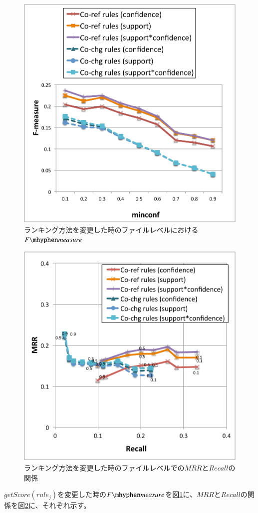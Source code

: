 \documentclass[a4paper]{jsbook}
\newcommand{\fmeasure}{F\mhyphen measure}
\newcommand{\getScore}{getS\!core}
\begin{document}
\begin{figure}[p]
  \centering
  \includegraphics[width = 0.95\linewidth]{resource/fmeasure_rank_f.pdf}
  \caption{ランキング方法を変更した時のファイルレベルにおける$\fmeasure$}
  \label{f_fmeasure_rank}
\end{figure}
\begin{figure}[p]
  \centering
  \includegraphics[width = 0.95\linewidth]{resource/mrgraph_rank_f.pdf}
  \caption{ランキング方法を変更した時のファイルレベルでの$MRR$と$Recall$の関係}
  \label{f_mrgraph_rank}
\end{figure}
$\getScore(rule_j)$を変更した時の$\fmeasure$を図\ref{f_fmeasure_rank}に、$MRR$と$Recall$の関係を図\ref{f_mrgraph_rank}に、それぞれ示す。
\end{document}

